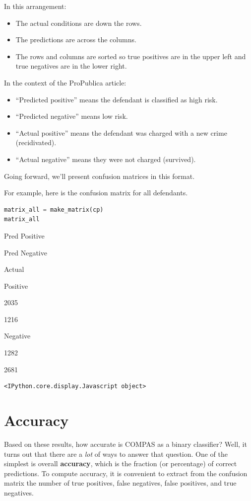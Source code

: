 In this arrangement:

\begin{itemize}
\item
  The actual conditions are down the rows.
\item
  The predictions are across the columns.
\item
  The rows and columns are sorted so true positives are in the upper
  left and true negatives are in the lower right.
\end{itemize}

In the context of the ProPublica article:

\begin{itemize}
\item
  ``Predicted positive'' means the defendant is classified as high risk.
\item
  ``Predicted negative'' means low risk.
\item
  ``Actual positive'' means the defendant was charged with a new crime
  (recidivated).
\item
  ``Actual negative'' means they were not charged (survived).
\end{itemize}

Going forward, we'll present confusion matrices in this format.

For example, here is the confusion matrix for all defendants.

\begin{lstlisting}[language=Python,style=source]
matrix_all = make_matrix(cp)
matrix_all
\end{lstlisting}

Pred Positive

Pred Negative

Actual

Positive

2035

1216

Negative

1282

2681

\begin{lstlisting}[style=output]
<IPython.core.display.Javascript object>
\end{lstlisting}

\hypertarget{accuracy}{%
\section{Accuracy}\label{accuracy}}

Based on these results, how accurate is COMPAS as a binary classifier?
Well, it turns out that there are a \emph{lot} of ways to answer that
question. One of the simplest is overall \textbf{accuracy}, which is the
fraction (or percentage) of correct predictions. To compute accuracy, it
is convenient to extract from the confusion matrix the number of true
positives, false negatives, false positives, and true negatives.

